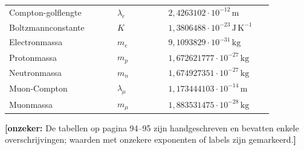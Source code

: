 \documentclass[11pt,a4paper]{article}
\newcommand{\onzeker}[1]{\ifmmode\text{\color{red!70!black}\bfseries[onzeker]}\else\textcolor{red!70!black}{\textbf{[onzeker:} #1\textbf{]}}\fi}
\begin{document}
\begin{longtable}{>{\raggedright\arraybackslash}p{0.36\linewidth} >{\centering\arraybackslash}p{0.17\linewidth} >{\raggedright\arraybackslash}p{0.35\linewidth}}
Compton-golflengte & $\lambda_e$ & $2{,}4263102\cdot 10^{-12}\,\mathrm{m}$ \\
Boltzmannconstante & $K$ & $1{,}3806488\cdot 10^{-23}\,\mathrm{J\,K^{-1}}$ \\
Electronmassa & $m_e$ & $9{,}1093829\cdot 10^{-31}\,\mathrm{kg}$ \\
Protonmassa & $m_p$ & $1{,}672621777\cdot 10^{-27}\,\mathrm{kg}$ \\
Neutronmassa & $m_n$ & $1{,}674927351\cdot 10^{-27}\,\mathrm{kg}$ \\
Muon-Compton & $\lambda_\mu$ & $1{,}173444103\cdot 10^{-14}\,\mathrm{m}$ \\
Muonmassa & $m_\mu$ & $1{,}883531475\cdot 10^{-28}\,\mathrm{kg}$ \\
\bottomrule
\end{longtable}

\onzeker{De tabellen op pagina 94--95 zijn handgeschreven en bevatten enkele overschrijvingen; waarden met onzekere exponenten of labels zijn gemarkeerd.}
\end{document}
